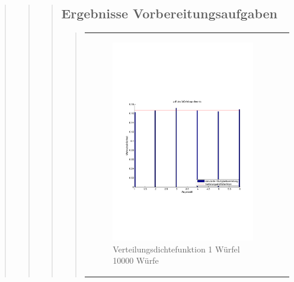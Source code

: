 \begin{quote}
\begin{quote}
\begin{quote}
			    \subsection{Ergebnisse Vorbereitungsaufgaben}
    \begin{quote}
            \begin{center}
            \begin{tabular}{ll}

            \hspace{-4em}
                \begin{minipage}{0.6\textwidth}

                    \begin{figure}[H]
                        \label{fig:}
                        \includegraphics[scale=0.3]{./Bilder/1wuerfelpdf} %
                        \caption{Verteilungsdichtefunktion 1 Würfel 10000 Würfe}
                    \end{figure}


\end{minipage}
\end{tabular}
\end{center}
\end{quote}
\end{quote}
\end{quote}
\end{quote}

